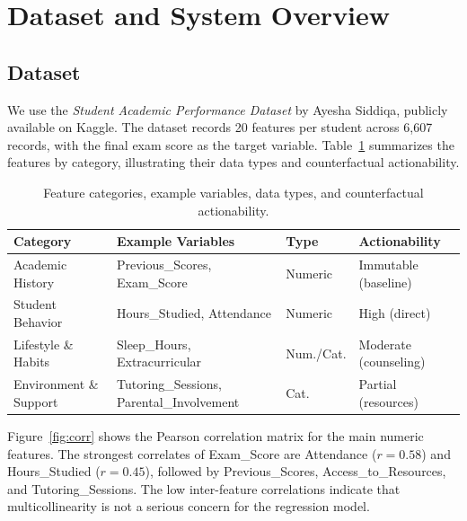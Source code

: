 \documentclass[11pt]{article}
\begin{document}
\section{Dataset and System Overview}
\label{sec:system}

\subsection{Dataset}

We use the \textit{Student Academic Performance Dataset} by Ayesha Siddiqa, publicly available on Kaggle. The dataset records 20 features per student across 6{,}607 records, with the final exam score as the target variable. Table~\ref{tab:features} summarizes the features by category, illustrating their data types and counterfactual actionability.

\begingroup
\renewcommand{\arraystretch}{1.5}
\begin{table}[t]
\centering
\small
\begin{tabular}{p{3.0cm} p{6cm} p{1.5cm} p{3.5cm}}
\toprule
\textbf{Category} & \textbf{Example Variables} & \textbf{Type} & \textbf{Actionability} \\
\midrule
Academic History & Previous\_Scores, Exam\_Score & Numeric & Immutable (baseline) \\
Student Behavior & Hours\_Studied, Attendance & Numeric & High (direct) \\
Lifestyle \& Habits & Sleep\_Hours, Extracurricular & Num./Cat. & Moderate (counseling) \\
Environment \& Support & Tutoring\_Sessions, Parental\_Involvement & Cat. & Partial (resources) \\
\bottomrule
\end{tabular}
\caption{Feature categories, example variables, data types, and counterfactual actionability.}
\label{tab:features}
\end{table}
\endgroup

Figure~\ref{fig:corr} shows the Pearson correlation matrix for the main numeric features. The strongest correlates of Exam\_Score are Attendance ($r = 0.58$) and Hours\_Studied ($r = 0.45$), followed by Previous\_Scores, Access\_to\_Resources, and Tutoring\_Sessions. The low inter-feature correlations indicate that multicollinearity is not a serious concern for the regression model.
\end{document}
